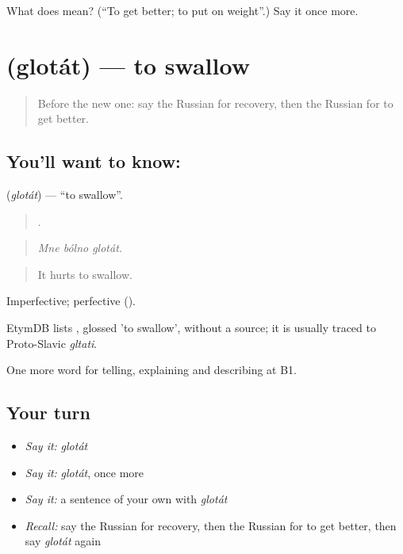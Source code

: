 \begin{tcolorbox}[breakable,colback=teal!4,colframe=teal!35!black,title={Before you move on}]
What does  mean? (\textquotedblleft{}To get better; to put on weight\textquotedblright{}.) Say it once more.
\end{tcolorbox}
\section[\texorpdfstring{\ru{глотать} (glotát)}{глотать (glotát)}]{ (glotát) — to swallow}

\label{lesson:RU-C490-glotat}



\begin{quote}
Before the new one: say the Russian for recovery, then the Russian for to get better.
\end{quote}

\subsection*{You'll want to know: }
\textbf{} (\emph{glotát}) — \textquotedblleft{}to swallow\textquotedblright{}.

\begin{quote}
  .
\end{quote}

\begin{quote}
\emph{Mne bólno glotát.}
\end{quote}

\begin{quote}
It hurts to swallow.
\end{quote}

Imperfective; perfective  ().

\begin{cousinweb}
EtymDB lists \emph{}, glossed 'to swallow', without a source; it is usually traced to Proto-Slavic \emph{gltati}.
\end{cousinweb}

\begin{grammarlens}[title={What you've built}]
One more word for telling, explaining and describing at B1.
\end{grammarlens}

\subsection*{Your turn}
\begin{itemize}
\raggedright
  \item \emph{Say it:} \emph{glotát}
  \item \emph{Say it:} \emph{glotát}, once more
  \item \emph{Say it:} a sentence of your own with \emph{glotát}
  \item \emph{Recall:} say the Russian for recovery, then the Russian for to get better, then say \emph{glotát} again
\end{itemize}

